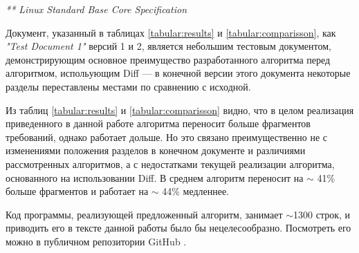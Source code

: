 \begin{table}[H]
\emph{** Linux Standard Base Core Specification}
\end{table}

Документ, указанный в таблицах \ref{tabular:results} и \ref{tabular:comparisson}, как \emph{"Test Document 1"} версий 1 и 2, является небольшим тестовым документом, демонстрирующим основное преимущество разработанного алгоритма перед алгоритмом, испольующим Diff --- в конечной версии этого документа некоторые разделы переставлены местами по сравнению с исходной.

Из таблиц \ref{tabular:results} и \ref{tabular:comparisson} видно, что в целом реализация приведенного в данной работе алгоритма переносит больше фрагментов требований, однако работает дольше. Но это связано преимущественно не с изменениями положения разделов в конечном документе и различиями рассмотренных алгоритмов, а с недостатками текущей реализации алгоритма, основанного на использовании Diff. В среднем алгоритм переносит на $\sim$ 41\% больше фрагментов и работает на $\sim$ 44\% медленнее.

Код программы, реализующей предложенный алгоритм, занимает $\sim$1300 строк, и приводить его в тексте данной работы было бы нецелесообразно. Посмотреть его можно в публичном репозитории GitHub \cite{web:github}. 